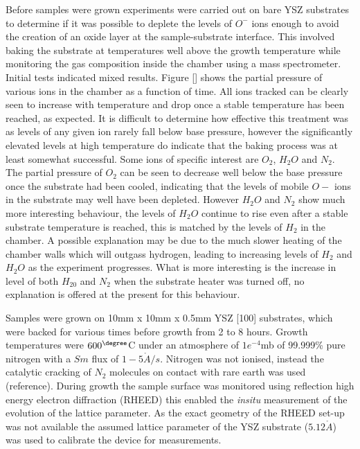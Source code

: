 \documentclass[11pt]{article}
\begin{document}
Before samples were grown experiments were carried out on bare YSZ substrates to determine if it was possible to deplete the levels of $O^-$ ions enough to avoid the creation of an oxide layer at the sample-substrate interface. This involved baking the substrate at temperatures well above the growth temperature while monitoring the gas composition inside the chamber using a mass spectrometer. Initial tests indicated mixed results. Figure [] shows the partial pressure of various ions in the chamber as a function of time. All ions tracked can be clearly seen to increase with temperature and drop once a stable temperature has been reached, as expected. It is difficult to determine how effective this treatment was as levels of any given ion rarely fall below base pressure, however the significantly elevated levels at high temperature do indicate that the baking process was at least somewhat successful. Some ions of specific interest are $O_2$, $H_2O$ and $N_2$. The partial pressure of $O_2$ can be seen to decrease well below the base pressure once the substrate had been cooled, indicating that the levels of mobile $O-$ ions in the substrate may well have been depleted. However $H_2O$ and $N_2$ show much more interesting behaviour, the levels of $H_2O$ continue to rise even after a stable substrate temperature is reached, this is matched by the levels of $H_2$ in the chamber. A possible explanation may be due to the much slower heating of the chamber walls which will outgass hydrogen, leading to increasing levels of $H_2$ and $H_2O$ as the experiment progresses. What is more interesting is the increase in level of both $H_20$ and $N_2$ when the substrate heater was turned off, no explanation is offered at the present for this behaviour.

 
Samples were grown on 10mm x 10mm x 0.5mm YSZ [100] substrates, which were backed for various times before growth from 2  to 8 hours. Growth temperatures were $600^\degree$C under an atmosphere of $1e^{-4}$mb of 99.999\% pure nitrogen with a $Sm$ flux of $1-5\mathring{A}/s$. Nitrogen was not ionised, instead the catalytic cracking of $N_2$ molecules on contact with rare earth was used (reference). During growth the sample surface was monitored using reflection high energy electron diffraction (RHEED) this enabled the \emph{insitu} measurement of the evolution of the lattice parameter. As the exact geometry of the RHEED set-up was not available the assumed lattice parameter of the YSZ substrate ($5.12\mathring{A}$) was used to calibrate the device for measurements. 
\end{document}
